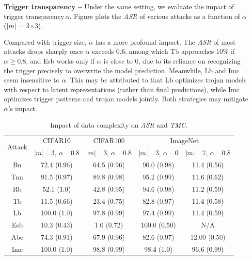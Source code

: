 \documentclass[compsoc,conference,a4paper,10pt,times]{IEEEtran}
\newcommand{\bn}{{\sc Bn}\xspace}
\newcommand{\tnn}{{\sc Tnn}\xspace}
\newcommand{\tb}{{\sc Tb}\xspace}
\newcommand{\lb}{{\sc Lb}\xspace}
\newcommand{\esb}{{\sc Esb}\xspace}
\newcommand{\rfb}{{\sc Rb}\xspace}
\newcommand{\abe}{{\sc Abe}\xspace}
\newcommand{\imc}{{\sc Imc}\xspace}
\newcommand{\asr}{{\em \small ASR}\xspace}
\newcommand{\tmc}{{\em \small TMC}\xspace}
\begin{document}
\vspace{2pt}
{\bf Trigger transparency --}  Under the same setting, we evaluate the impact of trigger transparency\,$\alpha$. Figure plots the \asr of various attacks as a function of $\alpha$ ($|m|$ = 3$\times$3). 

Compared with trigger size, $\alpha$ has a more profound impact. The \asr of most attacks drops sharply once $\alpha$ exceeds 0.6, among which \tb approaches 10\% if $\alpha \geq 0.8$, and \esb works only if $\alpha$ is close to 0, due to its reliance on recognizing the trigger precisely to overwrite the model prediction. Meanwhile, \lb and \imc seem insensitive to $\alpha$. This may be attributed to that \lb optimizes trojan models with respect to latent representations (rather than final predictions), while \imc optimizes trigger patterns and trojan models jointly. Both strategies may mitigate $\alpha$'s impact. 

\begin{table}[!ht]{\footnotesize
    \centering
    \renewcommand{\arraystretch}{1.1}
\setlength{\tabcolsep}{1pt}
    \begin{tabular}{c|c|c|c|c}
        \multirow{2}{*}{Attack} & {CIFAR10}  & {CIFAR100}    & \multicolumn{2}{c}{ImageNet}  \\
        \cline{2-5}
        & $|m|$\,=\,3, $\alpha$\,=\,0.8 & $|m|$\,=\,3, $\alpha$\,=\,0.8 & $|m|$\,=\,3, $\alpha$\,=\,0 & $|m|$\,=\,7, $\alpha$\,=\,0.8 \\
        \hline
        \hline 
        \bn     & 72.4 (0.96) & 64.5 (0.96) & 90.0 (0.98) &     11.4 (0.56)       \\
        \tnn    & 91.5 (0.97) & 89.8 (0.98) & 95.2 (0.99) &   11.6 (0.62)         \\
        \rfb     & 52.1 (1.0) & 42.8 (0.95) & 94.6 (0.98) &    11.2 (0.59)        \\
        \tb     & 11.5 (0.66) & 23.4 (0.75) & 82.8 (0.97) &    11.4 (0.58)        \\
        \lb     & \cellcolor{Red}100.0 (1.0) & 97.8 (0.99) & 97.4 (0.99) & 11.4 (0.59) \\
        \esb    & 10.3 (0.43) & 1.0 (0.72) & \cellcolor{Red}100.0 (0.50) &    N/A         \\
        \abe    & 74.3 (0.91) & 67.9 (0.96) & 82.6 (0.97) &    12.00 (0.50)           \\
        \imc    & \cellcolor{Red}100.0 (1.0) & \cellcolor{Red}98.8 (0.99) & 98.4 (1.0) &  \cellcolor{Red}96.6 (0.99)       \\
    \end{tabular}
    \caption{Impact of data complexity on \asr and \tmc. \label{tab:data-comprison}}}
\end{table}
\end{document}

